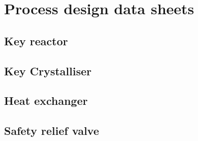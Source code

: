 \section{Process design data sheets}

\subsection{Key reactor}

\subsection{Key Crystalliser}

\subsection{Heat exchanger}

\subsection{Safety relief valve}

\subsection{}

\subsection{}

\subsection{}

\subsection{}

\subsection{}

\subsection{}

\subsection{}
